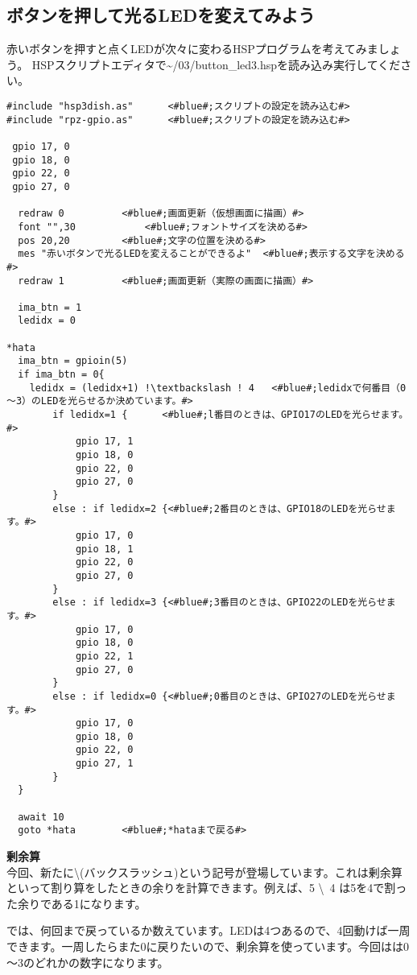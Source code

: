 \subsection{ボタンを押して光るLEDを変えてみよう}
赤いボタンを押すと点くLEDが次々に変わるHSPプログラムを考えてみましょう。
HSPスクリプトエディタで\textasciitilde /03/button\_led3.hspを読み込み実行してください。

\begin{lstlisting}[escapechar=!,caption=button\_led3.hsp,label=button_led3.hsp]
#include "hsp3dish.as"		<#blue#;スクリプトの設定を読み込む#>
#include "rpz-gpio.as"		<#blue#;スクリプトの設定を読み込む#>

 gpio 17, 0
 gpio 18, 0
 gpio 22, 0
 gpio 27, 0
	
  redraw 0			<#blue#;画面更新（仮想画面に描画）#>
  font "",30			<#blue#;フォントサイズを決める#>
  pos 20,20			<#blue#;文字の位置を決める#>
  mes "赤いボタンで光るLEDを変えることができるよ"	<#blue#;表示する文字を決める#>
  redraw 1			<#blue#;画面更新（実際の画面に描画）#>

  ima_btn = 1
  ledidx = 0

*hata
  ima_btn = gpioin(5)
  if ima_btn = 0{
    ledidx = (ledidx+1) !\textbackslash ! 4	  <#blue#;ledidxで何番目（0～3）のLEDを光らせるか決めています。#>
		if ledidx=1 {      <#blue#;l番目のときは、GPIO17のLEDを光らせます。#>
			gpio 17, 1
			gpio 18, 0
			gpio 22, 0
			gpio 27, 0
		}
		else : if ledidx=2 {<#blue#;2番目のときは、GPIO18のLEDを光らせます。#>
			gpio 17, 0
			gpio 18, 1
			gpio 22, 0
			gpio 27, 0
		}
		else : if ledidx=3 {<#blue#;3番目のときは、GPIO22のLEDを光らせます。#>
			gpio 17, 0
			gpio 18, 0
			gpio 22, 1
			gpio 27, 0
		}
		else : if ledidx=0 {<#blue#;0番目のときは、GPIO27のLEDを光らせます。#>
			gpio 17, 0
			gpio 18, 0
			gpio 22, 0
			gpio 27, 1
		}
  }

  await 10
  goto *hata		<#blue#;*hataまで戻る#>
\end{lstlisting}

\textbf{剰余算}\\
今回、新たに\textbackslash (バックスラッシュ)という記号が登場しています。これは剰余算といって割り算をしたときの余りを計算できます。例えば、5 \textbackslash \ 4 は5を4で割った余りである1になります。

では、何回まで戻っているか数えています。LEDは4つあるので、4回動けば一周できます。一周したらまた0に戻りたいので、剰余算を使っています。今回はは0～3のどれかの数字になります。\\

